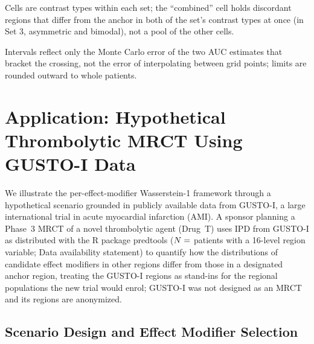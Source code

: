 \documentclass[AMA,Times1COL]{WileyNJDv5}
\begin{document}
\begin{table}[ht]
\centering
\caption{Per-region sample size at which selection AUC reaches 0.9, by cell and measure, interpolated on $\log n$ over the grid $n = 25$--2{,}000, with 95\% Monte Carlo (MC) intervals from the delta method applied to the log-$n$ interpolation. Cells whose AUC stays at chance (--) across the full grid are marked ``blind''; $\leq 25$ marks a target reached at the smallest grid size, where no interval is available.\label{tab:study2_required_n_mc}}%
%
\begin{tablenotes}
\item Cells are contrast types within each set; the ``combined'' cell holds discordant regions that differ from the anchor in both of the set's contrast types at once (in Set 3, asymmetric and bimodal), not a pool of the other cells.
\item Intervals reflect only the Monte Carlo error of the two AUC estimates that bracket the crossing, not the error of interpolating between grid points; limits are rounded outward to whole patients.
\end{tablenotes}
\end{table}






\section{Application: Hypothetical Thrombolytic MRCT Using GUSTO-I Data}\label{sec:application}

We illustrate the per-effect-modifier Wasserstein-1 framework through a hypothetical scenario grounded in publicly available data from GUSTO-I, a large international trial in acute myocardial infarction (AMI). A sponsor planning a Phase~3 MRCT of a novel thrombolytic agent (Drug~T) uses IPD from GUSTO-I\cite{gusto1993} as distributed with the R package predtools ($N = \numval{gustoN}$ patients with a 16-level region variable; Data availability statement) to quantify how the distributions of candidate effect modifiers in other regions differ from those in a designated anchor region, treating the GUSTO-I regions as stand-ins for the regional populations the new trial would enrol; GUSTO-I was not designed as an MRCT and its regions are anonymized.

\subsection{Scenario Design and Effect Modifier Selection}\label{sec:app_scenario}
\end{document}
